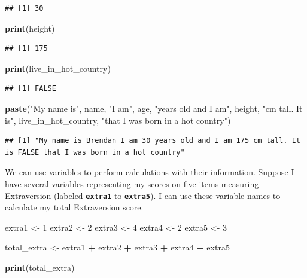 \documentclass[
]{book}
\newenvironment{Shaded}{\begin{snugshade}}{\end{snugshade}}
\newcommand{\DecValTok}[1]{\textcolor[rgb]{0.00,0.00,0.81}{#1}}
\newcommand{\FunctionTok}[1]{\textcolor[rgb]{0.13,0.29,0.53}{\textbf{#1}}}
\newcommand{\NormalTok}[1]{#1}
\newcommand{\OtherTok}[1]{\textcolor[rgb]{0.56,0.35,0.01}{#1}}
\newcommand{\SpecialCharTok}[1]{\textcolor[rgb]{0.81,0.36,0.00}{\textbf{#1}}}
\newcommand{\StringTok}[1]{\textcolor[rgb]{0.31,0.60,0.02}{#1}}
\begin{document}
\begin{verbatim}
## [1] 30
\end{verbatim}

\begin{Shaded}
\begin{Highlighting}[]
\FunctionTok{print}\NormalTok{(height)}
\end{Highlighting}
\end{Shaded}

\begin{verbatim}
## [1] 175
\end{verbatim}

\begin{Shaded}
\begin{Highlighting}[]
\FunctionTok{print}\NormalTok{(live\_in\_hot\_country)}
\end{Highlighting}
\end{Shaded}

\begin{verbatim}
## [1] FALSE
\end{verbatim}

\begin{Shaded}
\begin{Highlighting}[]
\FunctionTok{paste}\NormalTok{(}\StringTok{"My name is"}\NormalTok{, name, }\StringTok{"I am"}\NormalTok{, age, }\StringTok{"years old and I am"}\NormalTok{, height, }\StringTok{"cm tall. It is"}\NormalTok{, live\_in\_hot\_country, }\StringTok{"that I was born in a hot country"}\NormalTok{)}
\end{Highlighting}
\end{Shaded}

\begin{verbatim}
## [1] "My name is Brendan I am 30 years old and I am 175 cm tall. It is FALSE that I was born in a hot country"
\end{verbatim}

We can use variables to perform calculations with their information. Suppose I have several variables representing my scores on five items measuring Extraversion (labeled \textbf{\texttt{extra1}} to \textbf{\texttt{extra5}}). I can use these variable names to calculate my total Extraversion score.

\begin{Shaded}
\begin{Highlighting}[]
\NormalTok{extra1 }\OtherTok{\textless{}{-}} \DecValTok{1}
\NormalTok{extra2 }\OtherTok{\textless{}{-}} \DecValTok{2}
\NormalTok{extra3 }\OtherTok{\textless{}{-}} \DecValTok{4}
\NormalTok{extra4 }\OtherTok{\textless{}{-}} \DecValTok{2}
\NormalTok{extra5 }\OtherTok{\textless{}{-}} \DecValTok{3}

\NormalTok{total\_extra }\OtherTok{\textless{}{-}}\NormalTok{ extra1 }\SpecialCharTok{+}\NormalTok{ extra2 }\SpecialCharTok{+}\NormalTok{ extra3 }\SpecialCharTok{+}\NormalTok{ extra4 }\SpecialCharTok{+}\NormalTok{ extra5}

\FunctionTok{print}\NormalTok{(total\_extra)}
\end{Highlighting}
\end{Shaded}
\end{document}
